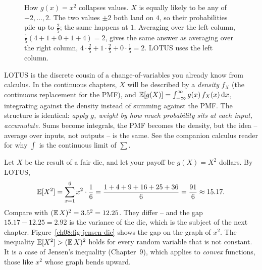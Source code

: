 \begin{figure}[H]
\centering
{}
\caption{How $g(x)=x^2$ collapses values. $X$ is equally likely to be any of
$-2,\dots,2$. The two values $\pm 2$ both land on $4$, so their probabilities
pile up to $\tfrac25$; the same happens at $1$. Averaging over the left column,
$\tfrac15(4+1+0+1+4)=2$, gives the same answer as averaging over the right
column, $4\cdot\tfrac25 + 1\cdot\tfrac25 + 0\cdot\tfrac15 = 2$. LOTUS uses the left column.}
\label{ch08:fig-lotus-collapse}
\end{figure}

\begin{connectionbox}
LOTUS is the discrete cousin of a change-of-variables you already know from
calculus. In the continuous chapters, $X$ will be described by a
\emph{density} $f_X$ (the continuous replacement for the PMF), and $\operatorname{\mathbb{E}}[g(X)] =
\int_{-\infty}^{\infty} g(x)\,f_X(x)\,\mathrm{d} x$, integrating against the density
instead of summing against the PMF. The structure is identical: \emph{apply $g$, weight by how much
probability sits at each input, accumulate}. Sums become integrals, the PMF
becomes the density, but the idea -- average over inputs, not outputs -- is the
same. See the companion calculus reader for why $\int$ is the continuous limit of
$\sum$.
\end{connectionbox}

\begin{example}
\label{ch08:ex-lotus}
Let $X$ be the result of a fair die, and let your payoff be $g(X) = X^2$ dollars.
By LOTUS,
\[
  \operatorname{\mathbb{E}}[X^2] = \sum_{x=1}^6 x^2 \cdot \frac16
          = \frac{1 + 4 + 9 + 16 + 25 + 36}{6} = \frac{91}{6} \approx 15.17.
\]
Compare with $(\operatorname{\mathbb{E}} X)^2 = 3.5^2 = 12.25$. They differ -- and the gap
$15.17 - 12.25 = 2.92$ is the variance of the die, which is the subject of the
next chapter. Figure~\ref{ch08:fig-jensen-die} shows the gap on the graph of
$x^2$. The inequality $\operatorname{\mathbb{E}}[X^2] > (\operatorname{\mathbb{E}} X)^2$ holds for every random
variable that is not constant. It is a case of Jensen's inequality (Chapter~9),
which applies to \emph{convex} functions, those like $x^2$ whose graph bends
upward.
\end{example}

